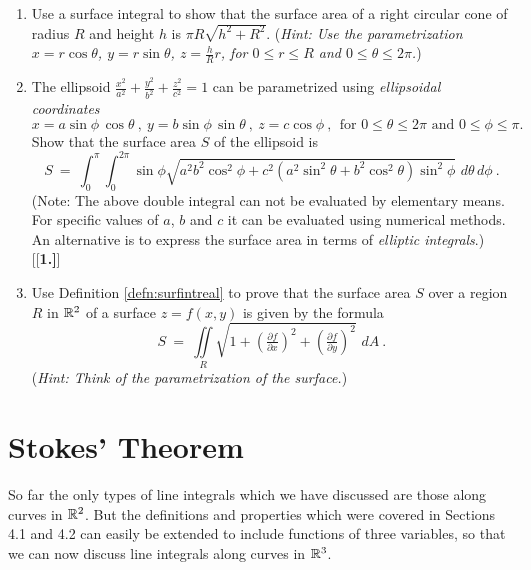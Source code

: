 \begin{enumerate}[\bfseries 1.]
\item Use a surface integral to show that the surface area of a right circular cone of radius $R$ and height $h$ is
  $\pi R \sqrt{h^2 + R^2}$. (\emph{Hint: Use the parametrization $x=r\cos\theta$, $y=r\sin\theta$, $z=\frac{h}{R}r$,
  for $0 \le r \le R$ and $0 \le \theta \le 2\pi$.})
 \item The ellipsoid $\frac{x^2}{a^2}+\frac{y^2}{b^2}+\frac{z^2}{c^2}=1$ can be parametrized using
 \emph{ellipsoidal coordinates}
 \begin{displaymath}
  x=a\sin\phi\,\cos\theta ~, ~y=b\sin\phi\,\sin\theta ~, ~z=c\cos\phi~, ~~\text{for $0 \le \theta \le 2\pi$ and
  $0 \le \phi \le \pi$.}
 \end{displaymath}
 Show that the surface area $S$ of the ellipsoid is
 \begin{displaymath}
  S ~=~ \int_0^{\pi} \int_0^{2\pi} \sin\phi \sqrt{a^2 b^2 \cos^2 \phi + c^2 (a^2 \sin^2 \theta + b^2 \cos^2 \theta )
  \sin^2 \phi} \,\,d\theta\,d\phi~.
 \end{displaymath}
 (Note: The above double integral can not be evaluated by elementary means. For specific values of $a$, $b$ and
 $c$ it can be evaluated using numerical methods. An alternative is to express the surface area in terms of
 \emph{elliptic integrals}.)
[{[\bfseries 1.]}]
 \item Use Definition \ref{defn:surfintreal} to prove that the surface area $S$ over a region $R$ in $\mathbb{R}^{2}$
  of a surface $z=f(x,y)$ is given by the formula
  \begin{displaymath}
   S ~=~ \iint\limits_R \sqrt{1 + \left( \tfrac{\partial f}{\partial x} \right)^2 +
   \left( \tfrac{\partial f}{\partial y} \right)^2} \,\,dA ~.
  \end{displaymath}
  (\emph{Hint: Think of the parametrization of the surface.})
\end{enumerate}
\newpage
\section{Stokes' Theorem}
So far the only types of line integrals which we have discussed are those along curves in $\mathbb{R}^{2}$. 
But the definitions and properties which were covered in Sections 4.1 and 4.2 can easily be extended to include functions of three variables, so that we can now discuss line integrals along curves in $\mathbb{R}^{3}$.

